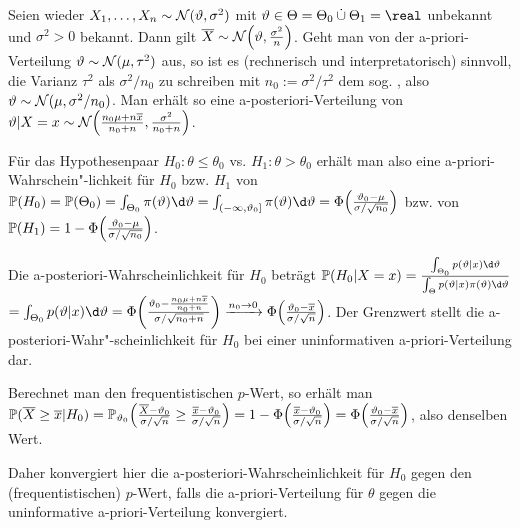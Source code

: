 \begin{Bsp}
    Seien wieder $X_1, \dotsc, X_n \sim \mathcal{N}(\vartheta, \sigma^2)$ mit
    $\theta \in \Theta = \Theta_0 \mathbin{\dot{\cup}} \Theta_1 = \real$ unbekannt und
    $\sigma^2 > 0$ bekannt.
    Dann gilt $\overline{X} \sim \mathcal{N}\!\left(\vartheta, \frac{\sigma^2}{n}\right)$.
    Geht man von der a-priori-Verteilung $\vartheta \sim \mathcal{N}(\mu, \tau^2)$ aus, so ist es
    (rechnerisch und interpretatorisch) sinnvoll,
    die Varianz $\tau^2$ als $\sigma^2/n_0$ zu schreiben mit
    $n_0 := \sigma^2/\tau^2$
    dem sog. , also $\vartheta \sim \mathcal{N}(\mu, \sigma^2/n_0)$.
    Man erhält so eine a-posteriori-Verteilung von
    $\vartheta|X=x \sim \mathcal{N}\!\left(\frac{n_0 \mu + n\overline{x}}{n_0 + n},
    \frac{\sigma^2}{n_0+n}\right)$.

    Für das Hypothesenpaar $H_0\colon \theta \le \theta_0$ vs. $H_1\colon \theta > \theta_0$
    erhält man also eine a-priori-Wahrschein"-lichkeit für $H_0$ bzw. $H_1$ von
    $\PP(H_0) = \PP(\Theta_0) = \int_{\Theta_0} \pi(\theta)\d\theta
    = \int_{(-\infty, \theta_0]} \pi(\theta)\d\theta =
    \Phi\!\left(\frac{\theta_0 - \mu}{\sigma/\sqrt{n_0}}\right)$ bzw. von
    $\mathbb{P}(H_1) = 1 - \Phi\!\left(\frac{\vartheta_0 - \mu}{\sigma/\sqrt{n_0}}\right)$.

    Die a-posteriori-Wahrscheinlichkeit für $H_0$ beträgt
    $\PP(H_0|X=x) = \frac{\int_{\Theta_0} p(\theta|x)\d\theta}
    {\int_\Theta p(\theta|x)\pi(\theta)\d\theta}$\\
    $= \int_{\Theta_0} p(\theta|x)\d\theta
    = \Phi\!\left(\frac{\theta_0 - \frac{n_0 \mu + n\overline{x}}{n_0 + n}}
    {\sigma/\sqrt{n_0+n}}\right)
    \xrightarrow{n_0 \to 0} \Phi\!\left(\frac{\theta_0 - \overline{x}}{\sigma/\sqrt{n}}\right)$.
    Der Grenzwert stellt die a-posteriori-Wahr"-scheinlichkeit für $H_0$ bei einer uninformativen
    a-priori-Verteilung dar.

    Berechnet man den frequentistischen $p$-Wert, so erhält man\\
    $\mathbb{P}(\overline{X} \ge \overline{x}|H_0) =
    \mathbb{P}_{\vartheta_0}\!\left(\frac{\overline{X} - \vartheta_0}{\sigma/\sqrt{n}} \ge
    \frac{\overline{x} - \vartheta_0}{\sigma/\sqrt{n}}\right)
    = 1 - \Phi\!\left(\frac{\overline{x} - \vartheta_0}{\sigma/\sqrt{n}}\right)
    = \Phi\!\left(\frac{\vartheta_0 - \overline{x}}{\sigma/\sqrt{n}}\right)$,
    also denselben Wert.

    Daher konvergiert hier die a-posteriori-Wahrscheinlichkeit für $H_0$ gegen den
    (frequentistischen) $p$-Wert, falls die a-priori-Verteilung für $\theta$ gegen die
    uninformative a-priori-Verteilung konvergiert.
\end{Bsp}

